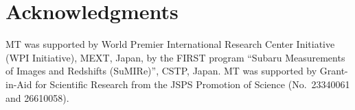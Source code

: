 \documentclass[iop, apj]{emulateapj}
\newcommand{\?}{\stackrel{?}{=}}
\begin{document}

\section*{Acknowledgments}

MT was supported by World Premier International Research Center
Initiative (WPI Initiative), MEXT, Japan, by the FIRST program ``Subaru
Measurements of Images and Redshifts (SuMIRe)'', CSTP, Japan. MT was supported 
by Grant-in-Aid for Scientific Research from the JSPS Promotion of Science
(No.~23340061 and 26610058). 



\end{document}
